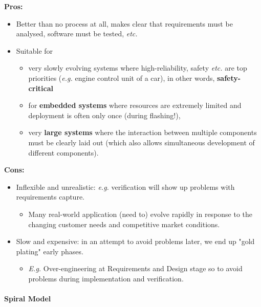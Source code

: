 \documentclass[a4paper]{article}
\providecommand{\tightlist}{%
  \setlength{\itemsep}{0pt}\setlength{\parskip}{0pt}}
\let\oldparagraph\paragraph
\renewcommand{\paragraph}[1]{\oldparagraph{#1}\mbox{}}
\begin{document}
\textbf{Pros:}

\begin{itemize}
\tightlist
\item
  Better than no process at all, makes clear that requirements must be
  analysed, software must be tested, \emph{etc.}
\item
  Suitable for

  \begin{itemize}
  \tightlist
  \item
    very slowly evolving systems where high-reliability, safety
    \emph{etc.} are top priorities (\emph{e.g.} engine control unit of a
    car), in other words, \textbf{safety-critical}
  \item
    for \textbf{embedded systems} where resources are extremely limited
    and deployment is often only once (during flashing!),
  \item
    very \textbf{large systems} where the interaction between multiple
    components must be clearly laid out (which also allows simultaneous
    development of different components).
  \end{itemize}
\end{itemize}

\textbf{Cons:}

\begin{itemize}
\tightlist
\item
  Inflexible and unrealistic: \emph{e.g.} verification will show up
  problems with requirements capture.

  \begin{itemize}
  \tightlist
  \item
    Many real-world application (need to) evolve rapidly in response to
    the changing customer needs and competitive market conditions.
  \end{itemize}
\item
  Slow and expensive: in an attempt to avoid problems later, we end up
  "gold plating" early phases.

  \begin{itemize}
  \tightlist
  \item
    \emph{E.g.} Over-engineering at Requirements and Design stage so to
    avoid problems during implementation and verification.
  \end{itemize}
\end{itemize}

\hypertarget{spiral-model}{%
\paragraph{Spiral Model}\label{spiral-model}}
\end{document}
